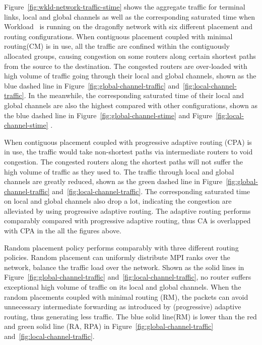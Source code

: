 Figure~\ref{fig:wkld-network-traffic-stime} shows the aggregate traffic for terminal links, local and global channels 
as well as the corresponding saturated time when 
Workload~ is running on the dragonfly network with six different placement and routing configurations. 
When contiguous placement coupled with minimal routing(CM) is in use, 
all the traffic are confined within the contiguously allocated groups, 
causing congestion on some routers along certain shortest paths from the source to the destination. 
The congested routers are over-loaded with high volume of traffic going through their local and global channels, 
shown as the blue dashed line in Figure~\ref{fig:global-channel-traffic} and~\ref{fig:local-channel-traffic}. 
In the meanwhile, the corresponding saturated time of their local and global channels are also the highest compared with other configurations, 
shown as the blue dashed line in Figure~\ref{fig:global-channel-stime} and Figure~\ref{fig:local-channel-stime} .



When contiguous placement coupled with progressive adaptive routing (CPA) is in use, 
the traffic would take non-shortest paths via intermediate routers to void congestion. 
The congested routers along the shortest paths will not suffer the high volume of traffic as they used to. 
The traffic through local and global channels are greatly reduced, 
shown as the green dashed line in Figure~\ref{fig:global-channel-traffic} and~\ref{fig:local-channel-traffic}. 
The corresponding saturated time on local and global channels also drop a lot, 
indicating the congestion are alleviated by using progressive adaptive routing. 
The adaptive routing performs comparably compared with progressive adaptive routing, 
thus CA is overlapped with CPA in the all the figures above.



Random placement policy performs comparably with three different routing policies.
Random placement can uniformly distribute MPI ranks over the network, 
balance the traffic load over the network. 
Shown as the solid lines in Figure~\ref{fig:global-channel-traffic} and~\ref{fig:local-channel-traffic}, 
no router suffers exceptional high volume of traffic on its local and global channels. 
When the random placements coupled with minimal routing (RM), 
the packets can avoid unnecessary intermediate forwarding as introduced by (progressive) adaptive routing, thus generating less traffic. 
The blue solid line(RM) is lower than the red and green solid line (RA, RPA) in Figure~\ref{fig:global-channel-traffic} and~\ref{fig:local-channel-traffic}. 



